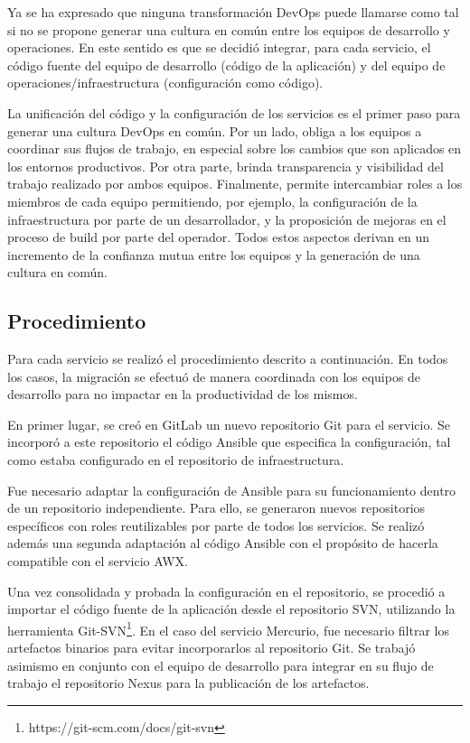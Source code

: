 Ya se ha expresado que ninguna transformación DevOps puede llamarse
como tal si no se propone generar una cultura en común entre los
equipos de desarrollo y operaciones. En este sentido es que se decidió
integrar, para cada servicio, el código fuente del equipo de
desarrollo (código de la aplicación) y del equipo de
operaciones/infraestructura (configuración como código).

La unificación del código y la configuración de los servicios es el
primer paso para generar una cultura DevOps en común. Por un lado,
obliga a los equipos a coordinar sus flujos de trabajo, en especial
sobre los cambios que son aplicados en los entornos productivos. Por
otra parte, brinda transparencia y visibilidad del trabajo realizado
por ambos equipos. Finalmente, permite intercambiar roles a los
miembros de cada equipo permitiendo, por ejemplo, la configuración de
la infraestructura por parte de un desarrollador, y la proposición de
mejoras en el proceso de build por parte del operador. Todos estos
aspectos derivan en un incremento de la confianza mutua entre los
equipos y la generación de una cultura en común.

\subsection{Procedimiento}

Para cada servicio se realizó el procedimiento descrito a
continuación. En todos los casos, la migración se efectuó de manera
coordinada con los equipos de desarrollo para no impactar en la
productividad de los mismos.

En primer lugar, se creó en GitLab un nuevo repositorio Git para el
servicio. Se incorporó a este repositorio el código Ansible que
especifica la configuración, tal como estaba configurado en el
repositorio de infraestructura.

Fue necesario adaptar la configuración de Ansible para su
funcionamiento dentro de un repositorio independiente. Para ello, se
generaron nuevos repositorios específicos con roles reutilizables por
parte de todos los servicios. Se realizó además una segunda adaptación
al código Ansible con el propósito de hacerla compatible con el
servicio AWX.

Una vez consolidada y probada la configuración en el repositorio, se
procedió a importar el código fuente de la aplicación desde el
repositorio SVN, utilizando la herramienta Git-SVN\footnote{
  https://git-scm.com/docs/git-svn}. En el caso del servicio Mercurio,
fue necesario filtrar los artefactos binarios para evitar
incorporarlos al repositorio Git. Se trabajó asimismo en conjunto con
el equipo de desarrollo para integrar en su flujo de trabajo el
repositorio Nexus para la publicación de los artefactos.

